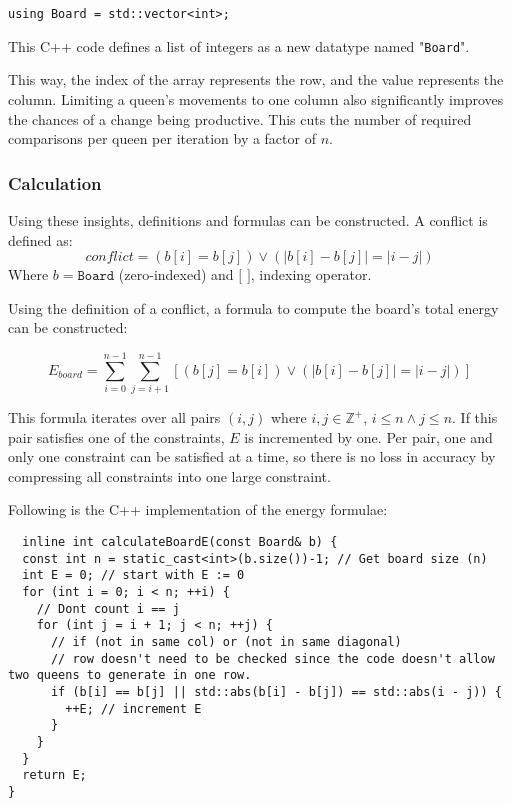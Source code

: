 \documentclass{article}
\begin{document}
\begin{lstlisting}
using Board = std::vector<int>;
\end{lstlisting}

This C++ code defines a list of integers as a new datatype named "\texttt{Board}".

This way, the index of the array represents the row, and the value represents the column.
Limiting a queen's movements to one column also significantly improves the chances of a change being productive.
This cuts the number of required comparisons per queen per iteration by a factor of $n$.

\subsubsection{Calculation}
Using these insights, definitions and formulas can be constructed.
A conflict is defined as:
\[
    conflict = \left(b[i] = b[j]\right) \lor \left( \left|b[i] - b[j]\right| = \left|i - j\right|\right)
\]
Where $b = \texttt{Board}$ (zero-indexed) and $[$  $]$, indexing operator.

\clearpage
Using the definition of a conflict, a formula to compute the board's total energy can be constructed:

\[
    E_{board} = \sum_{i=0}^{n-1} \sum_{j=i+1}^{n-1} \left[ (b[j] = b[i]) \lor \left( \left| b[i] - b[j] \right| = \left| i - j \right| \right) \right]
\]

This formula iterates over all pairs $(i, j)$ where $i, j \in \mathbb{Z}^+$, $i \leq n \land j \leq n$.
If this pair satisfies one of the constraints, $E$ is incremented by one.
Per pair, one and only one constraint can be satisfied at a time, so there is no loss in accuracy by compressing all constraints into one large constraint.

Following is the C++ implementation of the energy formulae:

\begin{lstlisting}
  inline int calculateBoardE(const Board& b) {
  const int n = static_cast<int>(b.size())-1; // Get board size (n)
  int E = 0; // start with E := 0
  for (int i = 0; i < n; ++i) {
    // Dont count i == j
    for (int j = i + 1; j < n; ++j) {
      // if (not in same col) or (not in same diagonal)
      // row doesn't need to be checked since the code doesn't allow two queens to generate in one row.
      if (b[i] == b[j] || std::abs(b[i] - b[j]) == std::abs(i - j)) {
        ++E; // increment E
      }
    }
  }
  return E;
}
\end{lstlisting}
\end{document}
